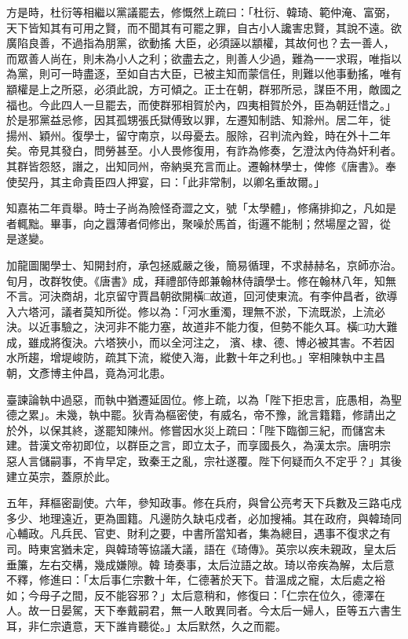\begin{pinyinscope}
 方是時，杜衍等相繼以黨議罷去，修慨然上疏曰：「杜衍、韓琦、範仲淹、富弼，天下皆知其有可用之賢，而不聞其有可罷之罪，自古小人讒害忠賢，其說不遠。欲廣陷良善，不過指為朋黨，欲動搖
 大臣，必須誣以顓權，其故何也？去一善人，而眾善人尚在，則未為小人之利；欲盡去之，則善人少過，難為一一求瑕，唯指以為黨，則可一時盡逐，至如自古大臣，已被主知而蒙信任，則難以他事動搖，唯有顓權是上之所惡，必須此說，方可傾之。正士在朝，群邪所忌，謀臣不用，敵國之福也。今此四人一旦罷去，而使群邪相賀於內，四夷相賀於外，臣為朝廷惜之。」於是邪黨益忌修，因其孤甥張氏獄傅致以罪，左遷知制誥、知滁州。居二年，徙
 揚州、穎州。復學士，留守南京，以母憂去。服除，召判流內銓，時在外十二年矣。帝見其發白，問勞甚至。小人畏修復用，有詐為修奏，乞澄汰內侍為奸利者。其群皆怨怒，譖之，出知同州，帝納吳充言而止。遷翰林學士，俾修《唐書》。奉使契丹，其主命貴臣四人押宴，曰：「此非常制，以卿名重故爾。」



 知嘉祐二年貢舉。時士子尚為險怪奇澀之文，號「太學體」，修痛排抑之，凡如是者輒黜。畢事，向之囂薄者伺修出，聚噪於馬首，街邏不能制；然場屋之習，從
 是遂變。



 加龍圖閣學士、知開封府，承包拯威嚴之後，簡易循理，不求赫赫名，京師亦治。旬月，改群牧使。《唐書》成，拜禮部侍郎兼翰林侍讀學士。修在翰林八年，知無不言。河決商胡，北京留守賈昌朝欲開橫□故道，回河使東流。有李仲昌者，欲導入六塔河，議者莫知所從。修以為：「河水重濁，理無不淤，下流既淤，上流必決。以近事驗之，決河非不能力塞，故道非不能力復，但勢不能久耳。橫□功大難成，雖成將復決。六塔狹小，而以全河注之，
 濱、棣、德、博必被其害。不若因水所趨，增堤峻防，疏其下流，縱使入海，此數十年之利也。」宰相陳執中主昌朝，文彥博主仲昌，竟為河北患。



 臺諫論執中過惡，而執中猶遷延固位。修上疏，以為「陛下拒忠言，庇愚相，為聖德之累」。未幾，執中罷。狄青為樞密使，有威名，帝不豫，訛言籍籍，修請出之於外，以保其終，遂罷知陳州。修嘗因水災上疏曰：「陛下臨御三紀，而儲宮未建。昔漢文帝初即位，以群臣之言，即立太子，而享國長久，為漢太宗。唐明宗
 惡人言儲嗣事，不肯早定，致秦王之亂，宗社遂覆。陛下何疑而久不定乎？」其後建立英宗，蓋原於此。



 五年，拜樞密副使。六年，參知政事。修在兵府，與曾公亮考天下兵數及三路屯戍多少、地理遠近，更為圖籍。凡邊防久缺屯戍者，必加搜補。其在政府，與韓琦同心輔政。凡兵民、官吏、財利之要，中書所當知者，集為總目，遇事不復求之有司。時東宮猶未定，與韓琦等協議大議，語在《琦傳》。英宗以疾未親政，皇太后垂簾，左右交構，幾成嫌隙。韓
 琦奏事，太后泣語之故。琦以帝疾為解，太后意不釋，修進曰：「太后事仁宗數十年，仁德著於天下。昔溫成之寵，太后處之裕如；今母子之間，反不能容邪？」太后意稍和，修復曰：「仁宗在位久，德澤在人。故一日晏駕，天下奉戴嗣君，無一人敢異同者。今太后一婦人，臣等五六書生耳，非仁宗遺意，天下誰肯聽從。」太后默然，久之而罷。




\end{pinyinscope}
